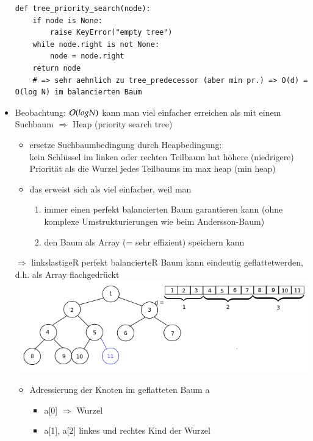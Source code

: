 \begin{itemize}
        \begin{verbatim}
def tree_priority_search(node):
    if node is None:
        raise KeyError("empty tree")
    while node.right is not None:
        node = node.right
    return node
    # => sehr aehnlich zu tree_predecessor (aber min pr.) => O(d) = O(log N) im balancierten Baum
        \end{verbatim}
        \item Beobachtung: $\mathcal{O}{}(logN)$ kann man viel einfacher erreichen als mit einem Suchbaum $\Rightarrow$ Heap (\glqq priority search tree\grqq  )
        \begin{itemize}
            \item ersetze Suchbaumbedingung durch Heapbedingung: \\
            \glqq kein Schlüssel im linken oder rechten Teilbaum hat höhere (niedrigere) Priorität als die Wurzel jedes Teilbaums im max heap (min heap)\grqq
            \item das erweist sich als viel einfacher, weil man
            \begin{enumerate}
                \item immer einen perfekt balancierten Baum garantieren kann (ohne komplexe Umstrukturierungen wie beim Andersson-Baum)
                \item den Baum als Array (= sehr effizient) speichern kann
            \end{enumerate}
        \end{itemize}
        $\Rightarrow$ linkslastigeR perfekt balancierteR Baum kann eindeutig \glqq geflattet\grqq werden, d.h. als Array \glqq flachgedrückt\grqq
        \includegraphics[width=16cm,height=4cm,keepaspectratio]{./Pictures/Flatten.png}
        \begin{itemize}
            \item Adressierung der Knoten im geflatteten Baum a \\
            \begin{itemize}
                \item a[0] $\Rightarrow$ Wurzel
                \item a[1], a[2] linkes und rechtes Kind der Wurzel

\end{itemize}
\end{itemize}
\end{itemize}
